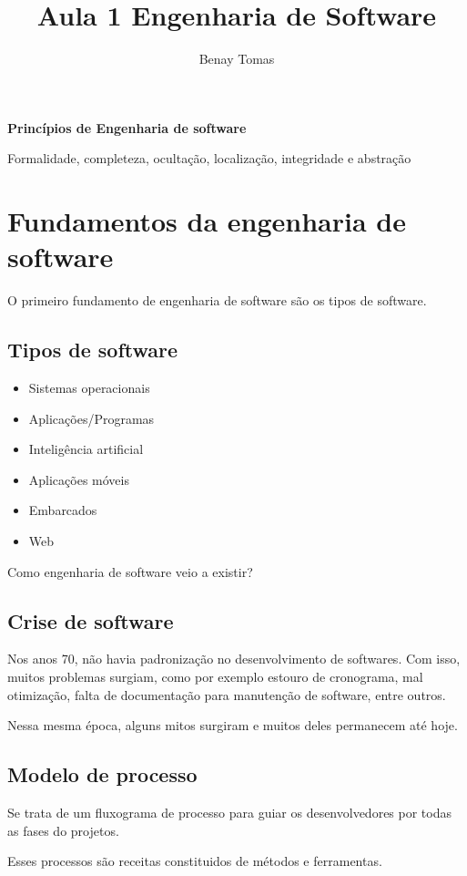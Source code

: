 \documentclass{article}
\title{Aula 1 Engenharia de Software}
\author{Benay Tomas}
\begin{document}
\selectfont

\maketitle

\thispagestyle{empty}
\textbf{Princípios de Engenharia de software}

Formalidade, completeza, ocultação, localização, integridade e
abstração

\section{Fundamentos da engenharia de software}
O primeiro fundamento de engenharia de software são os
tipos de software.
\subsection*{Tipos de software}
\begin{itemize}
    \item Sistemas operacionais
    \item Aplicações/Programas
    \item Inteligência artificial
    \item Aplicações móveis
    \item Embarcados
    \item Web
\end{itemize}

\noindent
Como engenharia de software veio a existir?

\subsection*{Crise de software}
Nos anos 70, não havia padronização no desenvolvimento
de softwares. Com isso, muitos problemas surgiam, como por exemplo
estouro de cronograma, mal otimização, falta de documentação 
para manutenção de software, entre outros.

Nessa mesma época, alguns mitos surgiram e muitos
deles permanecem até hoje.

\subsection*{Modelo de processo}
Se trata de um fluxograma de processo para guiar
os desenvolvedores por todas as fases do projetos.

Esses processos são receitas constituidos de métodos
e ferramentas.
\end{document}
